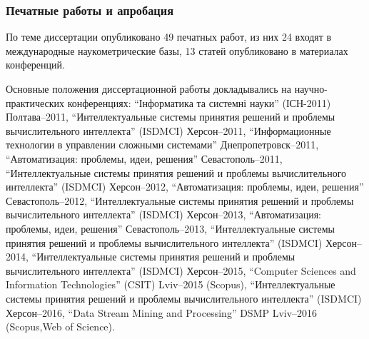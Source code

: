 \documentclass[14pt,handout,utf8]{beamer}
\begin{document}
\begin{frame}
  \frametitle{Печатные работы и апробация}

По теме диссертации опубликовано
49 печатных работ,
из них
24 входят в международные наукометрические базы,
13 статей опубликовано в материалах конференций.

{\scriptsize
Основные положения диссертационной работы докладывались на
научно-практических конференциях:
``Інформатика та системні науки'' (ІСН-2011) Полтава--2011,
``Интеллектуальные системы принятия решений и проблемы вычислительного интеллекта'' (ISDMCI) Херсон--2011,
``Информационные технологии в управлении сложными системами'' Днепропетровск--2011,
``Автоматизация: проблемы, идеи, решения'' Севастополь--2011,
``Интеллектуальные системы принятия решений и проблемы вычислительного интеллекта'' (ISDMCI) Херсон--2012,
``Автоматизация: проблемы, идеи, решения'' Севастополь--2012,
``Интеллектуальные системы принятия решений и проблемы вычислительного интеллекта'' (ISDMCI) Херсон--2013,
``Автоматизация: проблемы, идеи, решения'' Севастополь--2013,
``Интеллектуальные системы принятия решений и проблемы вычислительного интеллекта'' (ISDMCI) Херсон--2014,
``Интеллектуальные системы принятия решений и проблемы вычислительного интеллекта'' (ISDMCI) Херсон--2015,
``Computer Sciences and Information Technologies'' (CSIT) Lviv--2015 (Scopus),
``Интеллектуальные системы принятия решений и проблемы вычислительного интеллекта'' (ISDMCI) Херсон--2016,
``Data Stream Mining and Processing'' DSMP Lviv--2016 (Scopus,Web of Science).
}

\end{frame}




\end{document}
